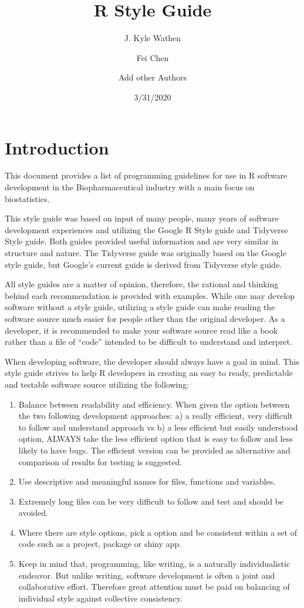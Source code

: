 \documentclass[
]{book}
\title{R Style Guide}
\author{J. Kyle Wathen \and Fei Chen \and Add other Authors}
\date{3/31/2020}
\begin{document}
\maketitle

{
\setcounter{tocdepth}{1}
\tableofcontents
}
\hypertarget{introduction}{%
\chapter{Introduction}\label{introduction}}

This document provides a list of programming guidelines for use in R software development in the Biopharmaceutical industry with a main focus on biostatistics.

This style guide was based on input of many people, many years of software development experiences and utilizing the Google R Style guide and Tidyverse Style guide. Both guides provided useful information and are very similar in structure and nature. The Tidyverse guide was originally based on the Google style guide, but Google's current guide is derived from Tidyverse style guide.

All style guides are a matter of opinion, therefore, the rational and thinking behind each recommendation is provided with examples. While one may develop software without a style guide, utilizing a style guide can make reading the software source much easier for people other than the original developer. As a developer, it is recommended to make your software source read like a book rather than a file of ``code'' intended to be difficult to understand and interpret.

When developing software, the developer should always have a goal in mind. This style guide strives to help R developers in creating an easy to ready, predictable and testable software source utilizing the following:

\begin{enumerate}
\def\labelenumi{\arabic{enumi}.}
\item
  Balance between readability and efficiency. When given the option between the two following development approaches: a) a really efficient, very difficult to follow and understand approach vs b) a less efficient but easily understood option, ALWAYS take the less efficient option that is easy to follow and less likely to have bugs. The efficient version can be provided as alternative and comparison of results for testing is suggested.
\item
  Use descriptive and meaningful names for files, functions and variables.
\item
  Extremely long files can be very difficult to follow and test and should be avoided.
\item
  Where there are style options, pick a option and be consistent within a set of code such as a project, package or shiny app.
\item
  Keep in mind that, programming, like writing, is a naturally
  individualistic endeavor. But unlike writing, software development is
  often a joint and collaborative effort. Therefore great attention must
  be paid on balancing of individual style against collective
  consistency.
\end{enumerate}
\end{document}
